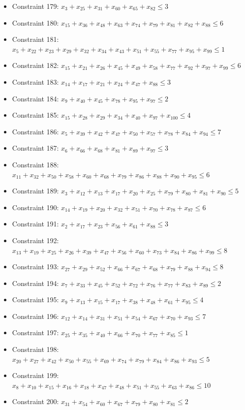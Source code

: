 \documentclass[11pt]{article}
\begin{document}
\begin{itemize}
\item Constraint 179: $x_{3} + x_{25} + x_{31} + x_{60} + x_{65} + x_{82} \le 3$
\item Constraint 180: $x_{15} + x_{36} + x_{48} + x_{63} + x_{74} + x_{79} + x_{81} + x_{82} + x_{88} \le 6$
\item Constraint 181: $x_{5} + x_{22} + x_{23} + x_{29} + x_{32} + x_{34} + x_{43} + x_{51} + x_{55} + x_{77} + x_{95} + x_{99} \le 1$
\item Constraint 182: $x_{15} + x_{21} + x_{26} + x_{45} + x_{49} + x_{58} + x_{77} + x_{92} + x_{97} + x_{99} \le 6$
\item Constraint 183: $x_{14} + x_{17} + x_{21} + x_{24} + x_{47} + x_{88} \le 3$
\item Constraint 184: $x_{9} + x_{40} + x_{45} + x_{78} + x_{95} + x_{97} \le 2$
\item Constraint 185: $x_{15} + x_{28} + x_{29} + x_{34} + x_{40} + x_{97} + x_{100} \le 4$
\item Constraint 186: $x_{5} + x_{39} + x_{42} + x_{47} + x_{50} + x_{57} + x_{78} + x_{84} + x_{94} \le 7$
\item Constraint 187: $x_{6} + x_{66} + x_{68} + x_{81} + x_{89} + x_{97} \le 3$
\item Constraint 188: $x_{11} + x_{32} + x_{50} + x_{58} + x_{60} + x_{68} + x_{79} + x_{86} + x_{88} + x_{90} + x_{95} \le 6$
\item Constraint 189: $x_{3} + x_{12} + x_{13} + x_{17} + x_{20} + x_{25} + x_{79} + x_{80} + x_{81} + x_{90} \le 5$
\item Constraint 190: $x_{14} + x_{19} + x_{20} + x_{32} + x_{51} + x_{70} + x_{78} + x_{87} \le 6$
\item Constraint 191: $x_{2} + x_{17} + x_{23} + x_{56} + x_{61} + x_{88} \le 3$
\item Constraint 192: $x_{13} + x_{19} + x_{25} + x_{26} + x_{39} + x_{47} + x_{56} + x_{60} + x_{73} + x_{84} + x_{86} + x_{99} \le 8$
\item Constraint 193: $x_{27} + x_{29} + x_{52} + x_{66} + x_{67} + x_{68} + x_{79} + x_{88} + x_{94} \le 8$
\item Constraint 194: $x_{7} + x_{33} + x_{45} + x_{52} + x_{72} + x_{76} + x_{77} + x_{83} + x_{89} \le 2$
\item Constraint 195: $x_{9} + x_{13} + x_{15} + x_{17} + x_{38} + x_{48} + x_{61} + x_{95} \le 4$
\item Constraint 196: $x_{12} + x_{14} + x_{31} + x_{51} + x_{54} + x_{67} + x_{70} + x_{93} \le 7$
\item Constraint 197: $x_{25} + x_{35} + x_{40} + x_{66} + x_{70} + x_{77} + x_{85} \le 1$
\item Constraint 198: $x_{20} + x_{27} + x_{42} + x_{50} + x_{55} + x_{69} + x_{74} + x_{79} + x_{84} + x_{86} + x_{93} \le 5$
\item Constraint 199: $x_{8} + x_{10} + x_{15} + x_{16} + x_{18} + x_{47} + x_{48} + x_{51} + x_{55} + x_{63} + x_{86} \le 10$
\item Constraint 200: $x_{31} + x_{54} + x_{60} + x_{67} + x_{79} + x_{80} + x_{81} \le 2$
\end{itemize}
\end{document}
